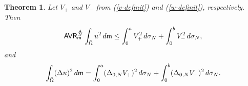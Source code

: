 \documentclass[11pt, reqno]{amsart}
\newtheorem{theorem}{Theorem}[section]
\numberwithin{equation}{section}
\begin{document}
		
		
		
		\begin{theorem} \label{talenti-result-thm}
			Let  $V_+$ and $V_-$ from {\rm (\ref{v-definit})} and {\rm (\ref{w-definit})}, respectively. Then
			\begin{equation}\label{u-v-w}
				{\sf AVR}_ {\sf m}^\frac{4}{N}	\int_{\tilde \Omega}u^2 \, {\rm d}{\sf m}\leq \int_{0}^aV_+^2 \, {\rm d}\sigma_N+\int_{0}^b V_-^2 \, {\rm d}\sigma_N,
			\end{equation}
			and
			\begin{equation}\label{laplace-hasonlitas}
				\int_{\tilde \Omega} (\Delta u)^2 \, {\rm d}{\sf m}=\int_{0}^a (\Delta_{0,N}V_+)^2 \, {\rm d}\sigma_N+ \int_{0}^b (\Delta_{0,N}V_-)^2 \, {\rm d}\sigma_N.
			\end{equation}
		\end{theorem}
\end{document}
